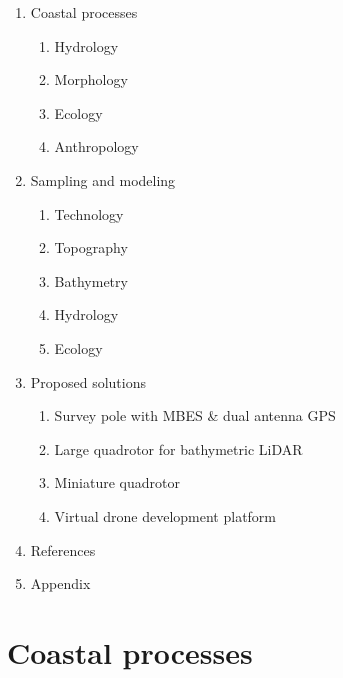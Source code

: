 \documentclass{article}
\begin{document}
\newpage
{}
\thispagestyle{fancy}
\begin{enumerate}
    \item{Coastal processes}
    \begin{enumerate}
        \item{Hydrology}
        \item{Morphology}
        \item{Ecology}
        \item{Anthropology}
    \end{enumerate}

    \item{Sampling and modeling}
    \begin{enumerate}
        \item{Technology}
        \item{Topography}
        \item{Bathymetry}
        \item{Hydrology}
        \item{Ecology}
    \end{enumerate}

    \item Proposed solutions
    \begin{enumerate}
        \item{Survey pole with MBES \& dual antenna GPS}
        \item{Large quadrotor for bathymetric LiDAR}
        \item{Miniature quadrotor}
        \item{Virtual drone development platform}
    \end{enumerate}

    \item{References}
    \item{Appendix}
\end{enumerate}


\newpage
{}
\fancyfoot[C]{\thepage} 
\thispagestyle{fancy}
\setcounter{page}{1}
\section{Coastal processes}

\end{document}
